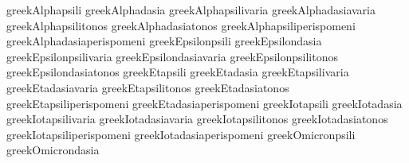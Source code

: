  greekAlphapsili                   {\greekpsili \greekAlpha}
 greekAlphadasia                   {\greekdasia \greekAlpha}
 greekAlphapsilivaria              {\greekpsilivaria \greekAlpha}
 greekAlphadasiavaria              {\greekdasiavaria \greekAlpha}
 greekAlphapsilitonos              {\greekpsilitonos \greekAlpha}
 greekAlphadasiatonos              {\greekdasiatonos \greekAlpha}
 greekAlphapsiliperispomeni        {\greekpsiliperispomeni \greekAlpha}
 greekAlphadasiaperispomeni        {\greekdasiaperispomeni \greekAlpha}
 greekEpsilonpsili                 {\greekpsili \greekEpsilon}
 greekEpsilondasia                 {\greekdasia \greekEpsilon}
 greekEpsilonpsilivaria            {\greekpsilivaria \greekEpsilon}
 greekEpsilondasiavaria            {\greekdasiavaria \greekEpsilon}
 greekEpsilonpsilitonos            {\greekpsilitonos \greekEpsilon}
 greekEpsilondasiatonos            {\greekdasiatonos \greekEpsilon}
 greekEtapsili                     {\greekpsili \greekEta}
 greekEtadasia                     {\greekdasia \greekEta}
 greekEtapsilivaria                {\greekpsilivaria \greekEta}
 greekEtadasiavaria                {\greekdasiavaria \greekEta}
 greekEtapsilitonos                {\greekpsilitonos \greekEta}
 greekEtadasiatonos                {\greekdasiatonos \greekEta}
 greekEtapsiliperispomeni          {\greekpsiliperispomeni \greekEta}
 greekEtadasiaperispomeni          {\greekdasiaperispomeni \greekEta}
 greekIotapsili                    {\greekpsili \greekIota}
 greekIotadasia                    {\greekdasia \greekIota}
 greekIotapsilivaria               {\greekpsilivaria \greekIota}
 greekIotadasiavaria               {\greekdasiavaria \greekIota}
 greekIotapsilitonos               {\greekpsilitonos \greekIota}
 greekIotadasiatonos               {\greekdasiatonos \greekIota}
 greekIotapsiliperispomeni         {\greekpsiliperispomeni \greekIota}
 greekIotadasiaperispomeni         {\greekdasiaperispomeni \greekIota}
 greekOmicronpsili                 {\greekpsili \greekOmicron}
 greekOmicrondasia                 {\greekdasia \greekOmicron}
